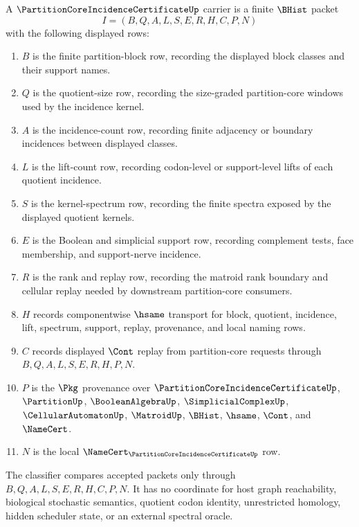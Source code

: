\begin{definition}
\label{def:partition-core-incidence-certificate-carrier}
A $\PartitionCoreIncidenceCertificateUp$ carrier is a finite $\BHist$ packet
$$
I=(B,Q,A,L,S,E,R,H,C,P,N)
$$
with the following displayed rows:
\begin{enumerate}
\item $B$ is the finite partition-block row, recording the displayed block classes and their support names.
\item $Q$ is the quotient-size row, recording the size-graded partition-core windows used by the incidence kernel.
\item $A$ is the incidence-count row, recording finite adjacency or boundary incidences between displayed classes.
\item $L$ is the lift-count row, recording codon-level or support-level lifts of each quotient incidence.
\item $S$ is the kernel-spectrum row, recording the finite spectra exposed by the displayed quotient kernels.
\item $E$ is the Boolean and simplicial support row, recording complement tests, face membership, and support-nerve incidence.
\item $R$ is the rank and replay row, recording the matroid rank boundary and cellular replay needed by downstream partition-core consumers.
\item $H$ records componentwise $\hsame$ transport for block, quotient, incidence, lift, spectrum, support, replay, provenance, and local naming rows.
\item $C$ records displayed $\Cont$ replay from partition-core requests through $B,Q,A,L,S,E,R,H,P,N$.
\item $P$ is the $\Pkg$ provenance over $\PartitionCoreIncidenceCertificateUp$, $\PartitionUp$, $\BooleanAlgebraUp$, $\SimplicialComplexUp$, $\CellularAutomatonUp$, $\MatroidUp$, $\BHist$, $\hsame$, $\Cont$, and $\NameCert$.
\item $N$ is the local $\NameCert_{\PartitionCoreIncidenceCertificateUp}$ row.
\end{enumerate}
The classifier compares accepted packets only through $B,Q,A,L,S,E,R,H,C,P,N$. It has no coordinate for host graph reachability, biological stochastic semantics, quotient codon identity, unrestricted homology, hidden scheduler state, or an external spectral oracle.
\end{definition}

